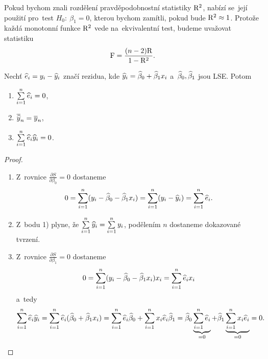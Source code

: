 Pokud bychom znali rozdělení pravděpodobnostní statistiky $\mathrm{R}^2$, nabízí se~její použití pro~test $H_0:~\beta_1=0$, kterou bychom zamítli, pokud bude $\mathrm{R}^2\approx1$. Protože každá monotonní funkce $\mathrm{R}^2$ vede na~ekvivalentní test, budeme uvažovat statistiku $$ \mathrm{F}=\frac{(n-2)\mathrm{R}}{1-\mathrm{R}^2}. $$

\begin{lemma}\label{lemma_k_vete}
	Nechť $\widehat{e}_i=y_i-\widehat{y}_i$ značí rezidua, kde $\widehat{y}_i=\widehat{\beta}_0+\widehat{\beta}_1 x_i$ a~$ \widehat{\beta}_0,\widehat{\beta}_1$ jsou LSE. Potom \begin{enumerate}
		\item $\sum\limits_{i=1}^{n}\widehat{e}_i=0$,
		\item $\overline{\widehat{y}}_n=\overline{y}_n$,
		\item $\sum\limits_{i=1}^{n} \widehat{e}_i\widehat{y}_i=0$.
	\end{enumerate}
\begin{proof}
	\begin{enumerate}
		\item Z~rovnice $\frac{\partial S}{\partial\beta_0}=0$ dostaneme $$ 0=\sum\limits_{i=1}^{n} (y_i-\widehat{\beta}_0-\widehat{\beta}_1 x_i)=\sum\limits_{i=1}^{n}(y_i-\widehat{y}_i)=\sum\limits_{i=1}^{n} \widehat{e}_i.$$
		\item Z~bodu 1) plyne, že $\sum\limits_{i=1}^{n}\widehat{y}_i=\sum\limits_{i=1}^{n} y_i$, podělením $n$ dostaneme dokazované tvrzení.
		\item Z~rovnice $\frac{\partial S}{\partial\beta_1}=0$ dostaneme $$0=\sum\limits_{i=1}^{n}(y_i-\widehat{\beta}_0-\widehat{\beta}_1 x_i)x_i=\sum\limits_{i=1}^{n} \widehat{e}_i x_i$$ a~tedy $$ \sum\limits_{i=1}^{n} \widehat{e}_i\widehat{y}_i=\sum\limits_{i=1}^{n} \widehat{e}_i (\widehat{\beta}_0+\widehat{\beta}_1 x_i)=\sum\limits_{i=1}^{n}\widehat{e}_i\widehat{\beta}_0+\sum\limits_{i=1}^{n} x_i \widehat{e}_i\widehat{\beta}_1=\widehat{\beta}_0\underbrace{\sum\limits_{i=1}^{n} \widehat{e}_i}_{=0}+\widehat{\beta}_1\underbrace{\sum\limits_{i=1}^{n} x_i\widehat{e}_i}_{=0}=0.$$
	\end{enumerate}
\end{proof}
\end{lemma}
